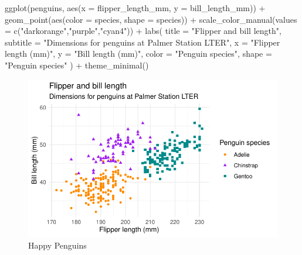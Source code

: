 \documentclass[
  12pt,
  a4paperpaper,
]{book}
\newenvironment{Shaded}{\begin{snugshade}}{\end{snugshade}}
\newcommand{\AttributeTok}[1]{\textcolor[rgb]{0.15,0.55,0.82}{#1}}
\newcommand{\FunctionTok}[1]{\textcolor[rgb]{0.15,0.55,0.82}{#1}}
\newcommand{\NormalTok}[1]{\textcolor[rgb]{0.40,0.48,0.51}{#1}}
\newcommand{\SpecialCharTok}[1]{\textcolor[rgb]{0.86,0.20,0.18}{#1}}
\newcommand{\StringTok}[1]{\textcolor[rgb]{0.16,0.63,0.60}{#1}}
\begin{document}
\begin{Shaded}
\begin{Highlighting}[numbers=left,,]
\FunctionTok{ggplot}\NormalTok{(penguins, }
       \FunctionTok{aes}\NormalTok{(}\AttributeTok{x =}\NormalTok{ flipper\_length\_mm, }\AttributeTok{y =}\NormalTok{ bill\_length\_mm)) }\SpecialCharTok{+}
  \FunctionTok{geom\_point}\NormalTok{(}\FunctionTok{aes}\NormalTok{(}\AttributeTok{color =}\NormalTok{ species, }\AttributeTok{shape =}\NormalTok{ species)) }\SpecialCharTok{+}
  \FunctionTok{scale\_color\_manual}\NormalTok{(}\AttributeTok{values =} \FunctionTok{c}\NormalTok{(}\StringTok{"darkorange"}\NormalTok{,}\StringTok{"purple"}\NormalTok{,}\StringTok{"cyan4"}\NormalTok{)) }\SpecialCharTok{+}
  \FunctionTok{labs}\NormalTok{(}
    \AttributeTok{title =} \StringTok{"Flipper and bill length"}\NormalTok{,}
    \AttributeTok{subtitle =} \StringTok{"Dimensions for penguins at Palmer Station LTER"}\NormalTok{,}
    \AttributeTok{x =} \StringTok{"Flipper length (mm)"}\NormalTok{, }\AttributeTok{y =} \StringTok{"Bill length (mm)"}\NormalTok{,}
    \AttributeTok{color =} \StringTok{"Penguin species"}\NormalTok{, }\AttributeTok{shape =} \StringTok{"Penguin species"}
\NormalTok{  ) }\SpecialCharTok{+}
  \FunctionTok{theme\_minimal}\NormalTok{()}
\end{Highlighting}
\end{Shaded}

\begin{figure}[H]

{\centering \includegraphics{./03_resultats_files/figure-pdf/fig-plot-penguins-1.pdf}

}

\caption{\label{fig-plot-penguins}Happy Penguins}

\end{figure}
\end{document}
